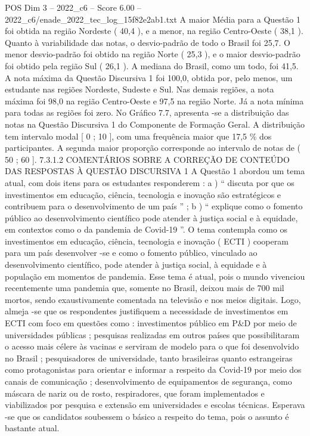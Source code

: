 \begin{textsample}{POS Dim 3 – 2022\_c6 – Score 6.00 – 2022\_c6/enade\_2022\_tec\_log\_15f82e2ab1.txt}
A maior Média para a Questão 1 foi obtida na região Nordeste ( 40,4 ), e a menor, na região Centro-Oeste ( 38,1 ).
Quanto à variabilidade das notas, o desvio-padrão de todo o Brasil foi 25,7.
O menor desvio-padrão foi obtido na região Norte ( 25,3 ), e o maior desvio-padrão foi obtido pela região Sul ( 26,1 ).
A mediana do Brasil, como um todo, foi 41,5.
A nota máxima da Questão Discursiva 1 foi 100,0, obtida por, pelo menos, um estudante nas regiões Nordeste, Sudeste e Sul.
Nas demais regiões, a nota máxima foi 98,0 na região Centro-Oeste e 97,5 na região Norte.
Já a nota mínima para todas as regiões foi zero.
No Gráfico 7.7, apresenta -se a distribuição das notas na Questão Discursiva 1 do Componente de Formação Geral.
A distribuição tem intervalo modal [ 0 ; 10 ], com uma frequência maior que 17,5 \% dos participantes.
A segunda maior proporção corresponde ao intervalo de notas de ( 50 ; 60 ]. 7.3.1.2 COMENTÁRIOS SOBRE A CORREÇÃO DE CONTEÚDO DAS RESPOSTAS À QUESTÃO DISCURSIVA 1 A Questão 1 abordou um tema atual, com dois itens para os estudantes responderem : a ) “ discuta por que os investimentos em educação, ciência, tecnologia e inovação são estratégicos e contribuem para o desenvolvimento de um país ” ; b ) “ explique como o fomento público ao desenvolvimento científico pode atender à justiça social e à equidade, em contextos como o da pandemia de Covid-19 ”.
O tema contempla como os investimentos em educação, ciência, tecnologia e inovação ( ECTI ) cooperam para um país desenvolver -se e como o fomento público, vinculado ao desenvolvimento científico, pode atender à justiça social, à equidade e à população em momentos de pandemia.
Esse tema é atual, pois o mundo vivenciou recentemente uma pandemia que, somente no Brasil, deixou mais de 700 mil mortos, sendo exaustivamente comentada na televisão e nos meios digitais.
Logo, almeja -se que os respondentes justifiquem a necessidade de investimentos em ECTI com foco em questões como : investimentos público em P\&D por meio de universidades públicas ; pesquisas realizadas em outros países que possibilitaram o acesso mais célere às vacinas e serviram de modelo para o que foi desenvolvido no Brasil ; pesquisadores de universidade, tanto brasileiras quanto estrangeiras como protagonistas para orientar e informar a respeito da Covid-19 por meio dos canais de comunicação ; desenvolvimento de equipamentos de segurança, como máscara de nariz ou de rosto, respiradores, que foram implementados e viabilizados por pesquisa e extensão em universidades e escolas técnicas.
Esperava -se que os candidatos soubessem o básico a respeito do tema, pois o assunto é bastante atual.

\end{textsample}
